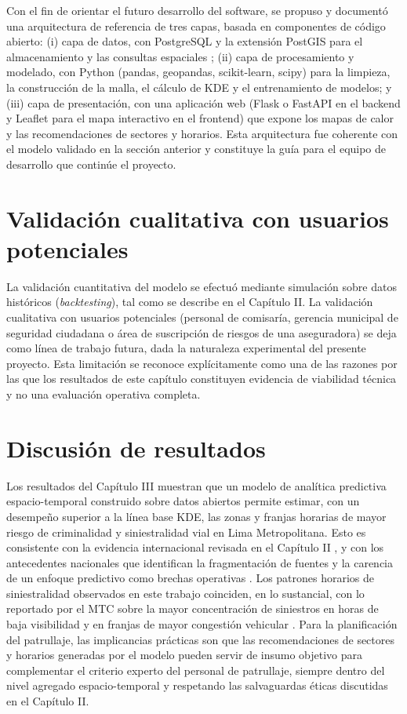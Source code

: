 Con el fin de orientar el futuro desarrollo del software, se propuso y document\'o una arquitectura de referencia de tres capas, basada en componentes de c\'odigo abierto: (i) capa de datos, con PostgreSQL y la extensi\'on PostGIS para el almacenamiento y las consultas espaciales \citep{postgis2024}; (ii) capa de procesamiento y modelado, con Python (pandas, geopandas, scikit-learn, scipy) para la limpieza, la construcci\'on de la malla, el c\'alculo de KDE y el entrenamiento de modelos; y (iii) capa de presentaci\'on, con una aplicaci\'on web (Flask o FastAPI en el backend y Leaflet para el mapa interactivo en el frontend) que expone los mapas de calor y las recomendaciones de sectores y horarios. Esta arquitectura fue coherente con el modelo validado en la secci\'on anterior y constituye la gu\'ia para el equipo de desarrollo que contin\'ue el proyecto.

\section{Validaci\'on cualitativa con usuarios potenciales}

La validaci\'on cuantitativa del modelo se efectu\'o mediante simulaci\'on sobre datos hist\'oricos (\textit{backtesting}), tal como se describe en el Cap\'itulo II. La validaci\'on cualitativa con usuarios potenciales (personal de comisar\'ia, gerencia municipal de seguridad ciudadana o \'area de suscripci\'on de riesgos de una aseguradora) se deja como l\'inea de trabajo futura, dada la naturaleza experimental del presente proyecto. Esta limitaci\'on se reconoce expl\'icitamente como una de las razones por las que los resultados de este cap\'itulo constituyen evidencia de viabilidad t\'ecnica y no una evaluaci\'on operativa completa.

\section{Discusi\'on de resultados}

Los resultados del Cap\'itulo III muestran que un modelo de anal\'itica predictiva espacio-temporal construido sobre datos abiertos permite estimar, con un desempe\~no superior a la l\'inea base KDE, las zonas y franjas horarias de mayor riesgo de criminalidad y siniestralidad vial en Lima Metropolitana. Esto es consistente con la evidencia internacional revisada en el Cap\'itulo II \citep{chainey2008kde,mohler2011selfexciting,perry2013predictive}, y con los antecedentes nacionales que identifican la fragmentaci\'on de fuentes y la carencia de un enfoque predictivo como brechas operativas \citep{sanchezguevara2022tabcop,mora2015sistematizacion}. Los patrones horarios de siniestralidad observados en este trabajo coinciden, en lo sustancial, con lo reportado por el MTC sobre la mayor concentraci\'on de siniestros en horas de baja visibilidad y en franjas de mayor congesti\'on vehicular \citep{mtc2024observatorio}. Para la planificaci\'on del patrullaje, las implicancias pr\'acticas son que las recomendaciones de sectores y horarios generadas por el modelo pueden servir de insumo objetivo para complementar el criterio experto del personal de patrullaje, siempre dentro del nivel agregado espacio-temporal y respetando las salvaguardas \'eticas discutidas en el Cap\'itulo II.